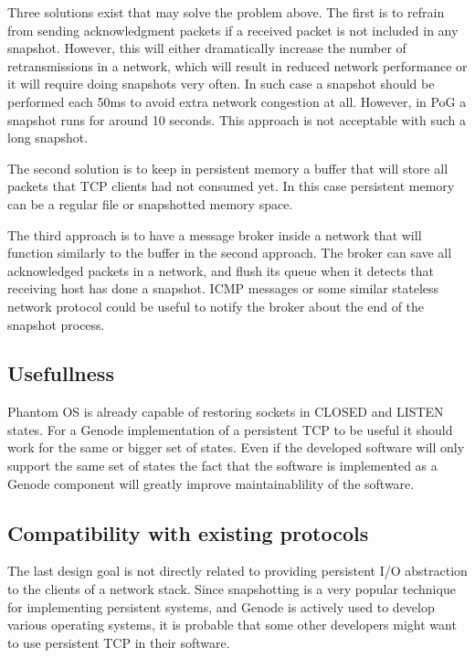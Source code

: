 Three solutions exist that may solve the problem above. The first is to refrain
from sending acknowledgment packets if a received packet is not included in any
snapshot. However, this will either dramatically increase the number of
retransmissions in a network, which will result in reduced network performance
or it will require doing snapshots very often. In such case a snapshot should
be performed each 50ms to avoid extra network congestion at all. However, in
PoG a snapshot runs for around 10 seconds. This approach is not acceptable with
such a long snapshot.  

The second solution is to keep in persistent memory a buffer that will store
all packets that TCP clients had not consumed yet. In this case persistent
memory can be a regular file or snapshotted memory space. 

The third approach is to have a message broker inside a network that will
function similarly to the buffer in the second approach. The broker can save
all acknowledged packets in a network, and flush its queue when it detects that
receiving host has done a snapshot. ICMP messages or some similar stateless
network protocol could be useful to notify the broker about the end of the
snapshot process.

\subsection {Usefullness}

Phantom OS is already capable of restoring sockets in CLOSED and LISTEN states.
For a Genode implementation of a persistent TCP to be useful it should work for
the same or bigger set of states. Even if the developed software will only
support the same set of states the fact that the software is implemented as a
Genode component will greatly improve maintainablility of the software.

\subsection {Compatibility with existing protocols}

The last design goal is not directly related to providing persistent I/O
abstraction to the clients of a network stack. Since snapshotting is a very
popular technique for implementing persistent systems, and Genode is actively
used to develop various operating systems, it is probable that some other
developers might want to use persistent TCP in their software.

